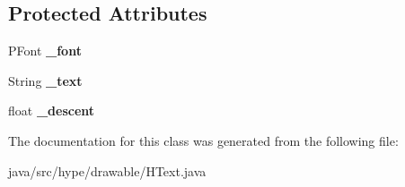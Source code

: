 \subsection*{Protected Attributes}
\begin{DoxyCompactItemize}
\item 
\hypertarget{classhype_1_1drawable_1_1_h_text_aa55ece9860aeab65ec09852184db221a}{P\-Font {\bfseries \-\_\-font}}\label{classhype_1_1drawable_1_1_h_text_aa55ece9860aeab65ec09852184db221a}

\item 
\hypertarget{classhype_1_1drawable_1_1_h_text_a110b21b7f159962f894f70bc46e075c6}{String {\bfseries \-\_\-text}}\label{classhype_1_1drawable_1_1_h_text_a110b21b7f159962f894f70bc46e075c6}

\item 
\hypertarget{classhype_1_1drawable_1_1_h_text_a35e53327d521ba4a19714923ec9b5cd2}{float {\bfseries \-\_\-descent}}\label{classhype_1_1drawable_1_1_h_text_a35e53327d521ba4a19714923ec9b5cd2}

\end{DoxyCompactItemize}


The documentation for this class was generated from the following file\-:\begin{DoxyCompactItemize}
\item 
java/src/hype/drawable/H\-Text.\-java\end{DoxyCompactItemize}
